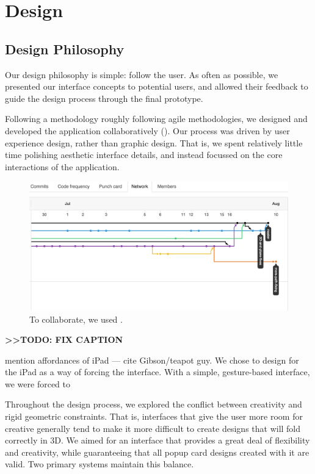 \chapter{Design}

\section{Design Philosophy}\label{design-philosophy}

Our design philosophy is simple: follow the user. As often as possible,
we presented our interface concepts to potential users, and allowed
their feedback to guide the design process through the final prototype.

Following a methodology roughly following agile methodologies, we
designed and developed the application collaboratively
(\citet{martin2003agile}). Our process was driven by user experience
design, rather than graphic design. That is, we spent relatively little
time polishing aesthetic interface details, and instead focussed on the
core interactions of the application.

\begin{figure}[htbp]
\centering
\includegraphics{figures/30_UI_Design_Philosophy/gitflow.png}
\caption{To collaborate, we used .}
\end{figure}

\textbf{\textgreater{}\textgreater{}TODO: FIX CAPTION}

mention affordances of iPad --- cite Gibson/teapot guy. We chose to
design for the iPad as a way of forcing the interface. With a simple,
gesture-based interface, we were forced to

Throughout the design process, we explored the conflict between
creativity and rigid geometric constraints. That is, interfaces that
give the user more room for creative generally tend to make it more
difficult to create designs that will fold correctly in 3D. We aimed for
an interface that provides a great deal of flexibility and creativity,
while guaranteeing that all popup card designs created with it are
valid. Two primary systems maintain this balance.

